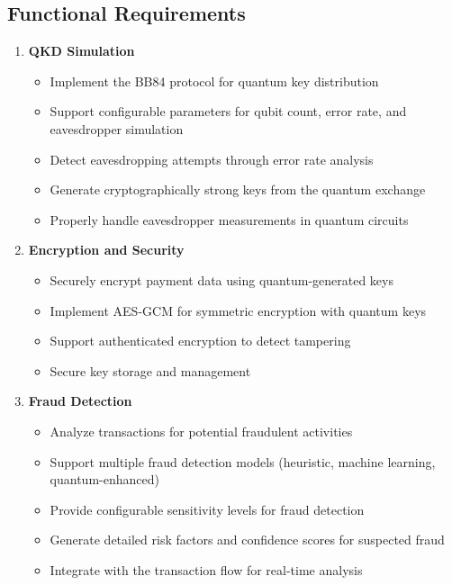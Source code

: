 \documentclass[conference]{IEEEtran}
\begin{document}
\subsection{Functional Requirements}
\begin{enumerate}
    \item \textbf{QKD Simulation}
    \begin{itemize}
        \item Implement the BB84 protocol for quantum key distribution
        \item Support configurable parameters for qubit count, error rate, and eavesdropper simulation
        \item Detect eavesdropping attempts through error rate analysis
        \item Generate cryptographically strong keys from the quantum exchange
        \item Properly handle eavesdropper measurements in quantum circuits
    \end{itemize}
    
    \item \textbf{Encryption and Security}
    \begin{itemize}
        \item Securely encrypt payment data using quantum-generated keys
        \item Implement AES-GCM for symmetric encryption with quantum keys
        \item Support authenticated encryption to detect tampering
        \item Secure key storage and management
    \end{itemize}
    
    \item \textbf{Fraud Detection}
    \begin{itemize}
        \item Analyze transactions for potential fraudulent activities
        \item Support multiple fraud detection models (heuristic, machine learning, quantum-enhanced)
        \item Provide configurable sensitivity levels for fraud detection
        \item Generate detailed risk factors and confidence scores for suspected fraud
        \item Integrate with the transaction flow for real-time analysis
    \end{itemize}
    

\end{enumerate}
\end{document}
